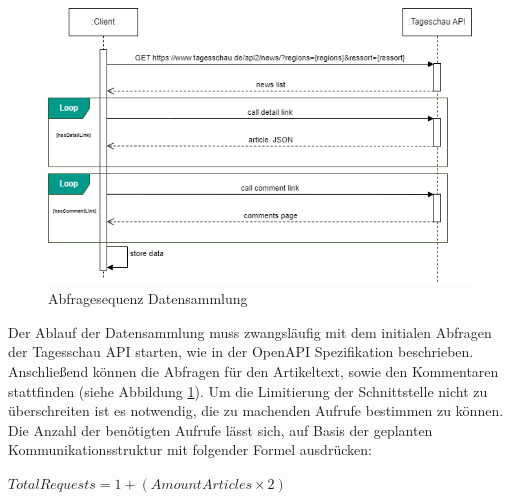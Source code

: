 \newpage

\begin{figure}
    \centering
    \includegraphics[width=1\linewidth]{abbildungen/Request Sequence.drawio.png}
    \caption{Abfragesequenz Datensammlung}
    \label{fig:Abfragesequenz Datensammlung}
\end{figure}
Der Ablauf der Datensammlung muss zwangsläufig mit dem initialen Abfragen der Tagesschau API starten, wie in der OpenAPI Spezifikation beschrieben. Anschließend können die Abfragen für den Artikeltext, sowie den Kommentaren stattfinden (siehe Abbildung \ref{fig:Abfragesequenz Datensammlung}). Um die Limitierung der Schnittstelle nicht zu überschreiten ist es notwendig, die zu machenden Aufrufe bestimmen zu können. Die Anzahl der benötigten Aufrufe lässt sich, auf Basis der geplanten Kommunikationsstruktur mit folgender Formel ausdrücken:

\(TotalRequests=1+(AmountArticles×2)\)

